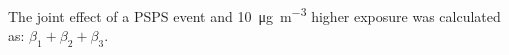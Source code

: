 \documentclass[../main.tex]{subfiles}
\begin{document}
\vspace{1em}

The joint effect of a PSPS event and \SI[per-mode=symbol]{10}{\micro\gram\per\cubic\metre} higher \PM exposure was calculated as: $\beta_1 + \beta_2 + \beta_3$. 

%   


\clearpage
\end{document}
